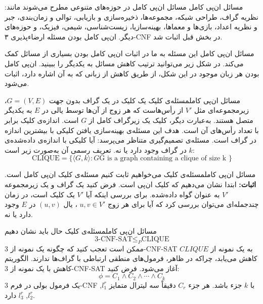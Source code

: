 \begin{itemframe}{مسائل ان‌پی کامل}
\itm
مسائل ان‌پی کامل در حوزه‌های متنوعی مطرح می‌شوند مانند: نظریه گراف، طراحی شبکه، مجموعه‌ها، ذخیره‌سازی و بازیابی، توالی و زمان‌بندی، جبر و نظریه اعداد، بازی‌ها و معماها، بهینه‌سازیا، زیست‌شناسی، شیمی، فیزیک، و حوزه‌های دیگر.
 \itm
ان‌پی کامل بودن مسئله ارضاءپذیری ۳-CNF‌ در بخش قبل اثبات شد.
\end{itemframe}


\begin{itemframe}{مسائل ان‌پی کامل}
\itm
این مسئله به ما در اثبات ان‌پی کامل بودن بسیاری از مسائل کمک می‌کند. در شکل زیر می‌توانید ترتیب کاهش مسائل به یکدیگر را ببینید.
\itm
ان‌‌پی کامل بودن هر زبان موجود در این شکل، از طریق کاهش از زبانی که به آن اشاره دارد، اثبات می‌شود.
\end{itemframe}


\begin{itemframe-s}{مسائل ان‌پی کامل}{مسئله‌ی کلیک}
\itm
یک کلیک
 در یک گراف بدون جهت $G = (V, E)$، زیرمجموعه‌ای مثل
$V'$
از رأس‌هاست که هر زوج از آن‌ها توسط یالی در $E$ به یکدیگر متصل هستند.
به‌عبارت دیگر، کلیک یک زیرگراف کامل از $G$ است.
اندازه‌ی کلیک برابر با تعداد رأس‌های آن است.
\itm
هدف این مسئله‌ی بهینه‌سازی یافتن کلیکی با بیشترین اندازه در گراف است.
مسئله‌ی تصمیم‌گیری متناظر می‌پرسد: آیا کلیکی با اندازه‌ی داده‌شده‌ی $k$ در گراف وجود دارد یا نه.
\itm
تعریف رسمی آن به‌صورت زیر است:
$$
\text{CLIQUE} = \{ \langle G, k \rangle : G \text{G is a graph containing a clique of size k } \}
$$
\end{itemframe-s}


\begin{itemframe-s}{مسائل ان‌پی کامل}{مسئله‌ی کلیک}
\itm
می‌خواهیم ثابت کنیم مسئله‌ی کلیک ان‌پی کامل است.
\itm
\textbf{اثبات:}
ابتدا نشان می‌دهیم که کلیک ان‌پی است. فرض کنید یک گراف و یک زیرمجموعه
$V'$
به عنوان گواه داده‌شده.
\itm
برای بررسی اینکه آیا $V'$ یک کلیک است، در زمان چندجمله‌ای می‌توان بررسی کرد که آیا برای هر زوج
$u, v \in V'$
، یال
$(u, v)$
در $E$ وجود دارد یا نه.

\end{itemframe-s}


\begin{itemframe-s}{مسائل ان‌پی کامل}{مسئله‌ی کلیک}
\itm
حال باید نشان دهیم
$$
\text{3-CNF-SAT} \leq_P \text{CLIQUE}
$$
\itm
ممکن است تعجب کنید که چگونه یک نمونه از 3-CNF-SAT به یک نمونه از $CLIQUE$ کاهش می‌یابد، چراکه در ظاهر، فرمول‌های منطقی ارتباطی با گراف‌ها ندارند.
\itm
الگوریتم کاهش با یک نمونه از 3-CNF-SAT آغاز می‌شود.
فرض کنید:
$$
\phi = C_1 \wedge C_2 \wedge \cdots \wedge C_k
$$
یک فرمول بولی در فرم 3-CNF با $k$ جزء
باشد.
هر جزء $C_r$ دقیقاً سه لیترال متمایز
$l^r_1$, $l^r_2$, $l^r_3$
دارد.
\end{itemframe-s}


